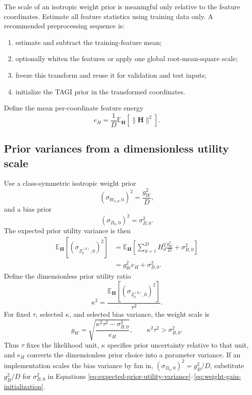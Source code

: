 \documentclass[11pt]{article}
\newcommand{\E}{\mathbb{E}}
\newcommand{\Olayer}{\mathtt{O}}
\begin{document}
The scale of an isotropic weight prior is meaningful only relative to the
feature coordinates.  Estimate all feature statistics using training data
only.  A recommended preprocessing sequence is:
\begin{enumerate}
 \item estimate and subtract the training-feature mean;
 \item optionally whiten the features or apply one global root-mean-square
 scale;
 \item freeze this transform and reuse it for validation and test inputs;
 \item initialize the TAGI prior in the transformed coordinates.
\end{enumerate}
Define the mean per-coordinate feature energy
\begin{equation}
 e_H
 =
 \frac{1}{D}\E_{\bm H}\!\left[\lVert\bm H\rVert^2\right].
 \label{eq:feature-energy}
\end{equation}

\subsection{Prior variances from a dimensionless utility scale}

Use a class-symmetric isotropic weight prior
\begin{equation}
 (\sigma_{W_{k,d},0})^2
 =
 \frac{g_W^2}{D},
 \label{eq:weight-prior-scale}
\end{equation}
and a bias prior
\begin{equation}
 (\sigma_{B_k,0})^2=\sigma_{B,0}^2.
 \label{eq:bias-prior-scale}
\end{equation}
The expected prior utility variance is then
\begin{align}
 \E_{\bm H}\!\left[
 (\sigma_{Z_k^{(\Olayer)},0})^2
 \right]
 &=
 \E_{\bm H}\!\left[
 \sum_{d=1}^{D}H_d^2\frac{g_W^2}{D}
 +\sigma_{B,0}^2
 \right]
 \\
 &=
 g_W^2e_H+\sigma_{B,0}^2.
 \label{eq:expected-prior-utility-variance}
\end{align}
Define the dimensionless prior utility ratio
\begin{equation}
 \boxed{
 \kappa^2
 =
 \frac{
 \E_{\bm H}[(\sigma_{Z_k^{(\Olayer)},0})^2]
 }{\tau^2}.}
 \label{eq:kappa-definition}
\end{equation}
For fixed $\tau$, selected $\kappa$, and selected bias variance, the weight
scale is
\begin{equation}
 \boxed{
 g_W
 =
 \sqrt{
 \frac{
 \kappa^2\tau^2-\sigma_{B,0}^2
 }{e_H}
 },}
 \qquad
 \kappa^2\tau^2>\sigma_{B,0}^2.
 \label{eq:weight-gain-initialization}
\end{equation}
Thus $\tau$ fixes the likelihood unit, $\kappa$ specifies prior uncertainty
relative to that unit, and $e_H$ converts the dimensionless prior choice into
a parameter variance.  If an implementation scales the bias variance by fan
in, $(\sigma_{B_k,0})^2=g_B^2/D$, substitute $g_B^2/D$ for
$\sigma_{B,0}^2$ in Equations
\eqref{eq:expected-prior-utility-variance}--\eqref{eq:weight-gain-initialization}.
\end{document}
